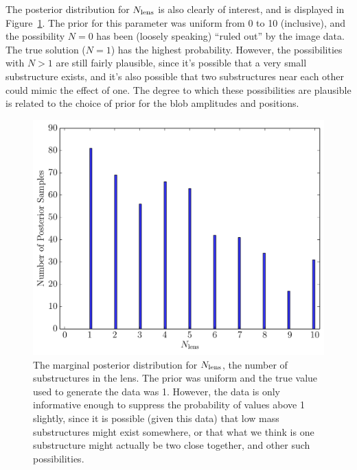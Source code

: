 \documentclass[useAMS,usenatbib]{mn2e}
\begin{document}
The posterior distribution for $N_{\rm lens}$ is also clearly of interest, and
is displayed in Figure~\ref{fig:N_lens1}. The prior for this parameter was
uniform from 0 to 10 (inclusive), and the possibility $N=0$ has been
(loosely speaking) ``ruled out'' by the image data. The true solution ($N=1$)
has the highest probability. However, the possibilities with $N > 1$ are
still fairly plausible, since it's possible that a very small substructure
exists, and it's also possible that two substructures near each other could
mimic the effect of one. The degree to which these possibilities are plausible
is related to the choice of prior for the blob amplitudes and positions.

\begin{figure}
\begin{center}
\includegraphics[scale=0.4]{N_lens1.pdf}
\caption{The marginal posterior distribution for $N_{\rm lens}$, the
number of substructures in the lens. The prior was uniform and the true
value used to generate the data was 1. However, the data is only informative
enough to suppress the probability of values above 1 slightly, since it
is possible (given this data) that low mass substructures might exist somewhere,
or that what we think is one substructure might actually be two close together,
and other such possibilities.
\label{fig:N_lens1}}
\end{center}
\end{figure}
\end{document}
